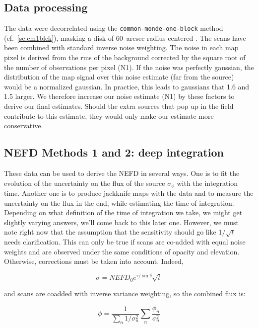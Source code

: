 \subsection{Data processing}

The data were decorrelated using the {\tt common-monde-one-block} method
(cf.~\ref{se:cm1blck}), masking a disk of 60~arcsec radius centered \hls.  The
scans have been combined with standard inverse noise weighting. The noise in
each map pixel is derived from the rms of the background corrected by the square
root of the number of observations per pixel (N1). If the noise was perfectly
gaussian, the distribution of the map signal over this noise estimate (far from
the source) would be a normalized gaussian. In practice, this leads to gaussians
that 1.6 and 1.5 larger. We therefore increase our noise estimate (N1) by these
factors to derive our final estimates. Should the extra sources that pop up in
the field contribute to this estimate, they would only make our estimate more
conservative.

\subsection{NEFD Methods 1 and 2: deep integration}





These data can be used to derive the NEFD in several ways. One is to fit the
evolution of the uncertainty on the flux of the source $\sigma_\phi$ with the
integration time. Another one is to produce jackknife maps with the data and to
measure the uncertainty on the flux in the end, while estimating the time of
integration. Depending on what definition of the time of integration we take, we
might get slightly varying answers, we'll come back to this later one. However,
we must note right now that the assumption that the sensitivity should go like
$1/\sqrt{t}$ needs clarification. This can only be true if scans are co-added
with equal noise weights and are observed under the same conditions of opacity
and elevation. Otherwise, corrections must be taken into account. Indeed, 

\begin{equation}
\sigma = NEFD_0e^{\tau/\sin\delta}\sqrt{t}
\label{eq:sigma_nefd}
\end{equation}

and scans are coadded with inverse variance weighting, so the combined flux is:

\begin{equation}
\phi = \frac{1}{\sum_n 1/\sigma_n^2}\sum_n\frac{\phi_n}{\sigma_n^2}
\end{equation}

